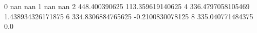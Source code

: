 0 nan nan
1 nan nan
2 448.400390625 113.359619140625
4 336.4797058105469 1.438934326171875
6 334.8306884765625 -0.2100830078125
8 335.040771484375 0.0
